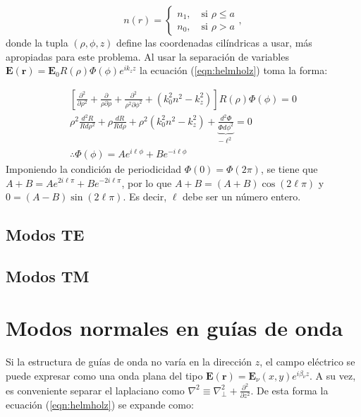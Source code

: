 \begin{equation}
	n(r) = 
	\left\{\begin{matrix}
	n_1, \quad \text{si } \rho \le a
	\\
	n_0, \quad \text{si } \rho > a
	\end{matrix}\right.
	,\nonumber
\end{equation}
donde la tupla $(\rho, \phi, z)$ define las coordenadas cilíndricas a usar, más apropiadas para este problema. Al usar la separación de variables $ \textbf{E}(\textbf{r}) =  \textbf{E}_0 R(\rho)\Phi(\phi) e^{ik_z z} $ la ecuación (\ref{eqn:helmholz}) toma la forma:

\begin{align}
	\left[\frac{\partial^2}{\partial \rho^2} + \frac{\partial}{\rho\partial \rho} + \frac{\partial^2}{\rho^2\partial \phi^2} +\left( k_0^2n^2 - k_z^2 \right)\right]  R(\rho)\Phi(\phi) = 0
	\nonumber
	\\
\rho^2\frac{d^2 R}{Rd\rho^2} + \rho\frac{dR}{Rd\rho} + \rho^2\left( k_0^2n^2 - k_z^2 \right) + \underbrace{\frac{d^2 \Phi}{\Phi d\phi^2}}_{-\ell^2} = 0
\nonumber
\\
\therefore \Phi(\phi) = Ae^{i\ell\phi} + Be^{-i\ell\phi}
\nonumber
\end{align}
Imponiendo la condición de periodicidad $\Phi(0)=\Phi(2\pi)$, se tiene que $A+B=Ae^{2i\ell\pi}+Be^{-2i\ell\pi}$, por lo que $A+B=(A+B)\cos(2\ell\pi)$ y $0=(A-B)\sin(2\ell\pi)$. Es decir, $\ell$ debe ser un número entero.

\subsection{Modos TE}
\subsection{Modos TM}
\section{Modos normales en guías de onda}

Si la estructura de guías de onda no varía en la dirección $z$, el campo eléctrico se puede expresar como una onda plana del tipo $\textbf{E}(\textbf{r}) = \textbf{E}_\nu(x, y) e^{i\beta_\nu z}$. A su vez, es conveniente separar el laplaciano como $\nabla^2 \equiv \nabla_\perp^2 + \frac{\partial^2}{\partial z^2}$. De esta forma la ecuación (\ref{eqn:helmholz}) se expande como:

